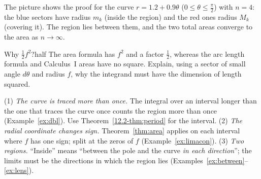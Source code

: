 \documentclass[11pt]{article}
\begin{document}
\begin{center}
\end{center}

The picture shows the proof for the curve $r=1.2+0.9\theta$ ($0\le\theta\le\frac\pi2$) with $n=4$: the blue sectors have radius $m_k$ (inside the region) and the red ones radius $M_k$ (covering it). The region lies between them, and the two total areas converge to the area as $n\to\infty$.

\begin{think}{Why $\frac12f^2$?}{half}
The area formula has $f^2$ and a factor $\frac12$, whereas the arc length formula and Calculus~I areas have no square. Explain, using a sector of small angle $d\theta$ and radius $f$, why the integrand must have the dimension of length squared.
\end{think}

\begin{warn}
(1) \emph{The curve is traced more than once.} The integral over an interval longer than the one that traces the curve once counts the region more than once (Example~\ref{ex:dbl}). Use Theorem~\ref{12.2-thm:period} for the interval. (2) \emph{The radial coordinate changes sign.} Theorem~\ref{thm:area} applies on each interval where $f$ has one sign; split at the zeros of $f$ (Example~\ref{ex:limacon}). (3) \emph{Two regions.} ``Inside'' means ``between the pole and the curve \emph{in each direction}''; the limits must be the directions in which the region lies (Examples~\ref{ex:between}--\ref{ex:lens}).
\end{warn}
\end{document}
